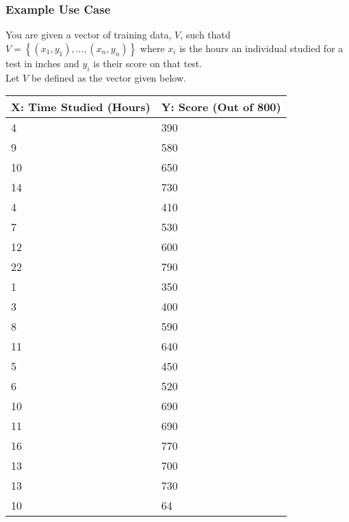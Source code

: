 \documentclass[a4paper]{article}
\begin{document}
\subsubsection{Example Use Case}
You are given a vector of training data, $V$, such thatd $V = \left \{(x_1,y_1), ... ,(x_n,y_n) \right \}$ where $x_i$ is the hours an individual studied for a test in inches and $y_i$ is their score on that test. \\
Let $V$ be defined as the vector given below.
\begin{center}
    \begin{tabular}{ | l | l |} \hline
	    X: Time Studied (Hours) & Y: Score (Out of 800)  \\ \hline
		    4 & 390 \\ \hline
			9 & 580 \\ \hline
			10 & 650 \\ \hline
			14 & 730 \\ \hline
			4 & 410 \\ \hline
			7 & 530 \\ \hline
			12 & 600 \\ \hline
			22 & 790 \\ \hline
			1 & 350 \\ \hline
			3 & 400 \\ \hline
			8 & 590 \\ \hline
			11 & 640 \\ \hline
			5 & 450 \\ \hline
			6 & 520 \\ \hline
			10 & 690 \\ \hline
			11 & 690 \\ \hline
			16 & 770 \\ \hline
			13 & 700 \\ \hline
			13 & 730 \\ \hline
			10 & 64 \\ \hline
    \end{tabular}
\end{center}
\end{document}
